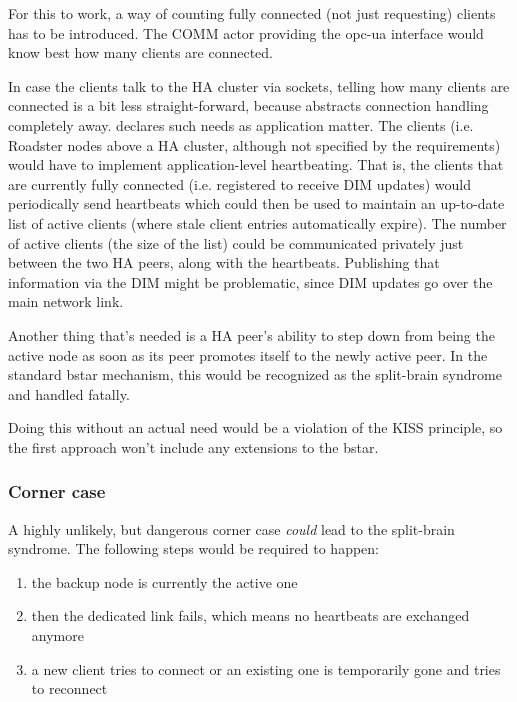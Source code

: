For this to work, a way of counting fully connected (not just requesting)
clients has to be introduced. The COMM actor providing the \gls{opc-ua}
interface would know best how many clients are connected.

In case the clients talk to the HA cluster via \zmq sockets, telling how many
clients are connected is a bit less straight-forward, because \zmq abstracts
connection handling completely away. \zmq declares such needs as application matter.
The clients (i.e. Roadster nodes above a HA cluster, although not specified by
the requirements) would have to implement application-level heartbeating.
That is, the clients that are currently fully connected (i.e. registered to
receive DIM updates) would periodically send heartbeats which could then be
used to maintain an up-to-date list of active clients (where stale client
entries automatically expire).  The number of active clients (the size of the
list) could be communicated privately just between the two HA peers, along with
the heartbeats. Publishing that information via the DIM might be problematic,
since DIM updates go over the main network link.

Another thing that's needed is a HA peer's ability to step down from being the
active node as soon as its peer promotes itself to the newly active peer. In
the standard \gls{bstar} mechanism, this would be recognized as the split-brain
syndrome and handled fatally.

Doing this without an actual need would be a violation of the KISS principle,
so the first approach won't include any extensions to the \gls{bstar}.

\subsubsection{Corner case}
A highly unlikely, but dangerous corner case \emph{could} lead to the
split-brain syndrome. The following steps would be required to happen:

\begin{enumerate}
	\item the backup node is currently the active one

	\item then the dedicated link fails, which means no heartbeats are
		exchanged anymore

	\item a new client tries to connect or an existing one is temporarily
		gone and tries to reconnect
\end{enumerate}

